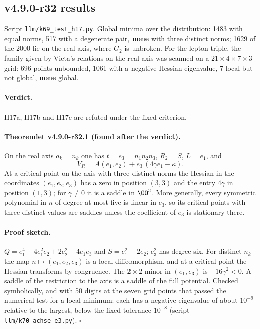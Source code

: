 \subsection*{v4.9.0-r32 results}
\label{subsec:v490-r32-results}

Script \texttt{llm/k69\_test\_h17.py}.  Global minima over the distribution: 1483 with equal norms, 517 with a degenerate
pair, \textbf{none} with three distinct norms; 1629 of the 2000 lie on the real axis, where \(G_2\) is unbroken.  For the
lepton triple, the family given by Vieta's relations on the real axis was scanned on a \(21\times4\times7\times3\) grid:
696 points unbounded, 1061 with a negative Hessian eigenvalue, 7 local but not global, \textbf{none} global.

\paragraph{Verdict.}
H17a, H17b and H17c are refuted under the fixed criterion.

\paragraph{Theoremlet v4.9.0-r32.1 (found after the verdict).}
On the real axis \(a_k=n_k\) one has \(t=e_3=n_1n_2n_3\), \(R_2=S\), \(L=e_1\), and
\[
V_R=A(e_1,e_2)+e_3\,(4\gamma e_1-\kappa).
\]
At a critical point on the axis with three distinct norms the Hessian in the coordinates \((e_1,e_2,e_3)\) has a zero
in position \((3,3)\) and the entry \(4\gamma\) in position \((1,3)\); for \(\gamma\neq0\) it is a saddle in
\(\OO^3\).  More generally, every symmetric polynomial in \(n\) of degree at most five is linear in \(e_3\), so its
critical points with three distinct values are saddles unless the coefficient of \(e_3\) is stationary there.

\paragraph{Proof sketch.}
\(Q=e_1^4-4e_1^2e_2+2e_2^2+4e_1e_3\) and \(S=e_1^2-2e_2\); \(e_3^2\) has degree six.  For distinct \(n_k\) the map
\(n\mapsto(e_1,e_2,e_3)\) is a local diffeomorphism, and at a critical point the Hessian transforms by congruence.  The
\(2\times2\) minor in \((e_1,e_3)\) is \(-16\gamma^2<0\).  A saddle of the restriction to the axis is a saddle of the
full potential.  Checked symbolically, and with 50 digits at the seven grid points that passed the numerical test for a
local minimum: each has a negative eigenvalue of about \(10^{-9}\) relative to the largest, below the fixed tolerance
\(10^{-8}\) (script \texttt{llm/k70\_achse\_e3.py}).  \(\square\)

